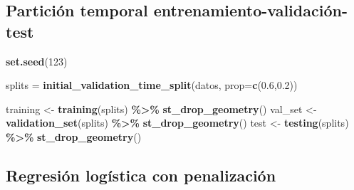 \documentclass[12pt,a4paper,]{book}
\newenvironment{Shaded}{\begin{snugshade}}{\end{snugshade}}
\newcommand{\AttributeTok}[1]{\textcolor[rgb]{0.13,0.29,0.53}{#1}}
\newcommand{\DecValTok}[1]{\textcolor[rgb]{0.00,0.00,0.81}{#1}}
\newcommand{\FloatTok}[1]{\textcolor[rgb]{0.00,0.00,0.81}{#1}}
\newcommand{\FunctionTok}[1]{\textcolor[rgb]{0.13,0.29,0.53}{\textbf{#1}}}
\newcommand{\NormalTok}[1]{#1}
\newcommand{\OtherTok}[1]{\textcolor[rgb]{0.56,0.35,0.01}{#1}}
\newcommand{\SpecialCharTok}[1]{\textcolor[rgb]{0.81,0.36,0.00}{\textbf{#1}}}
\numberwithin{dummy}{section}
\theoremstyle{ocrenumbox}
\theoremstyle{blacknumex}
\theoremstyle{blacknumbox}
\theoremstyle{ocrenum}
\theoremstyle{ocrenum}
\begin{document}
\hypertarget{particiuxf3n-temporal-entrenamiento-validaciuxf3n-test-1}{%
\subsection{Partición temporal
entrenamiento-validación-test}\label{particiuxf3n-temporal-entrenamiento-validaciuxf3n-test-1}}

\begin{Shaded}
\begin{Highlighting}[]
\FunctionTok{set.seed}\NormalTok{(}\DecValTok{123}\NormalTok{)}

\NormalTok{splits }\OtherTok{=} \FunctionTok{initial\_validation\_time\_split}\NormalTok{(datos, }
                                       \AttributeTok{prop=}\FunctionTok{c}\NormalTok{(}\FloatTok{0.6}\NormalTok{,}\FloatTok{0.2}\NormalTok{))}

\NormalTok{training }\OtherTok{\textless{}{-}} \FunctionTok{training}\NormalTok{(splits) }\SpecialCharTok{\%\textgreater{}\%}  \FunctionTok{st\_drop\_geometry}\NormalTok{()}
\NormalTok{val\_set }\OtherTok{\textless{}{-}} \FunctionTok{validation\_set}\NormalTok{(splits) }\SpecialCharTok{\%\textgreater{}\%} \FunctionTok{st\_drop\_geometry}\NormalTok{()}
\NormalTok{test  }\OtherTok{\textless{}{-}} \FunctionTok{testing}\NormalTok{(splits) }\SpecialCharTok{\%\textgreater{}\%} \FunctionTok{st\_drop\_geometry}\NormalTok{()}
\end{Highlighting}
\end{Shaded}

\hypertarget{regresiuxf3n-loguxedstica-con-penalizaciuxf3n-1}{%
\subsection{Regresión logística con
penalización}\label{regresiuxf3n-loguxedstica-con-penalizaciuxf3n-1}}
\end{document}
